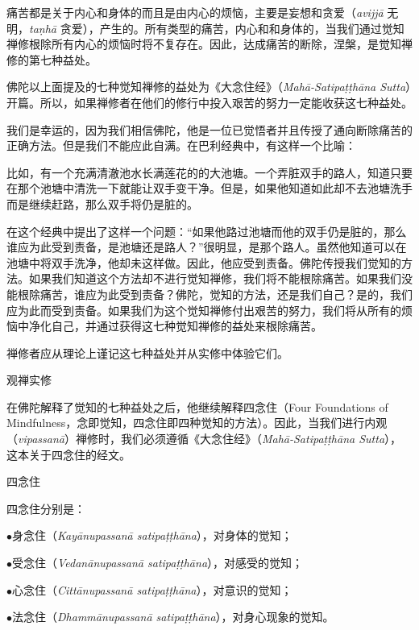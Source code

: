 痛苦都是关于内心和身体的而且是由内心的烦恼，主要是妄想和贪爱（{\it avijj\=a} 无明，{\it ta\d nh\=a} 贪爱），产生的。所有类型的痛苦，\1内心和和身体的，当我们通过觉知禅修根除所有内心的烦恼时将不复存在。因此，达成痛苦的断除，涅槃，是觉知禅修的第七种益处。

佛陀以上面提及的七种觉知禅修的益处为《大念住经》（{\it Mah\=a-Satipa\d t\d th\=ana Sutta}）开篇。所以，如果禅修者在他们的修行中投入艰苦的努力一定能收获这七种益处。

我们是幸运的，因为我们相信佛陀，他是一位已觉悟者并且传授了通向断除痛苦的正确方法。但是我们不能应此自满。在巴利经典中，有这样一个比喻：

比如，有一个充满清澈池水长满莲花的的大池塘。一个弄脏双手的路人，知道只要在那个池塘中清洗一下就能让双手变干净。但是，如果他知道如此却不去池塘洗手而是继续赶路，那么双手将仍是脏的。

在这个经典中提出了这样一个问题：“如果他路过池塘而他的双手仍是脏的，那么谁应为此受到责备，是池塘还是路人？”很明显，是那个路人。虽然他知道可以在池塘中将双手洗净，他却未这样做。因此，他应受到责备。佛陀传授我们觉知的方法。如果我们知道这个方法却不进行觉知禅修，我们将不能根除痛苦。如果我们没能根除痛苦，谁应为此受到责备？佛陀，觉知的方法，还是我们自己？是的，我们应为此而受到责备。如果我们为这个觉知禅修付出艰苦的努力，我们将从所有的烦恼中净化自己，并通过获得这七种\1觉知禅修的益处来根除痛苦。

禅修者应从理论上谨记这七种益处并从实修中体验它们。

\subsectnon 观禅实修

在佛陀解释了觉知的七种益处之后，他继续解释四念住（Four Foundations of Mindfulness，念即觉知，四念住即四种觉知的方法）。因此，当我们进行内观（{\it vipassan\=a}）禅修时，我们必须遵循《大念住经》（{\it Mah\=a-Satipa\d t\d th\=ana Sutta}），这本关于四念住的经文。

\ssubsectnon 四念住

四念住分别是：

{
\leftskip=1.6pc
\item{$\bullet$}身念住（{\it Kay\=anupassan\=a satipa\d t\d th\=ana}），对身体的觉知；
\item{$\bullet$}受念住（{\it Vedan\=anupassan\=a satipa\d t\d th\=ana}），对感受的觉知；
\item{$\bullet$}心念住（{\it Citt\=anupassan\=a satipa\d t\d th\=ana}），对意识的觉知；
\item{$\bullet$}法念住（{\it Dhamm\=anupassan\=a satipa\d t\d th\=ana}），对身心现象的觉知。

}


